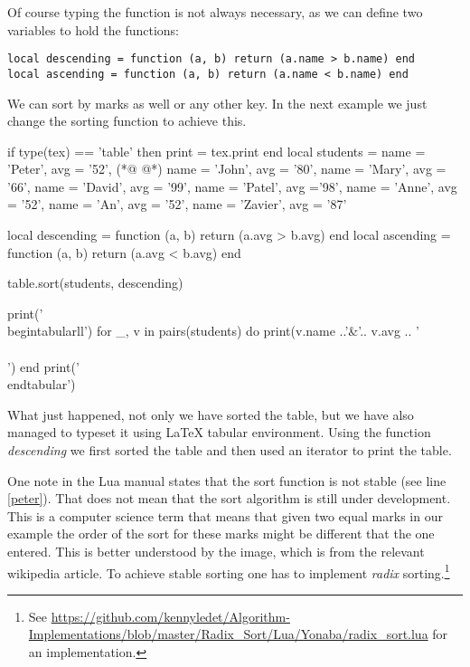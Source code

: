 Of course typing the function is not always necessary, as we can define two variables to hold the functions:

\begin{scriptexample}{}{}
\begin{verbatim}
local descending = function (a, b) return (a.name > b.name) end
local ascending = function (a, b) return (a.name < b.name) end
\end{verbatim}
\end{scriptexample}

We can sort by marks as well or any other key. In the next example we just change the sorting function to achieve this.


\begin{teX}
\begin{luacode}
if type(tex) == 'table' then print = tex.print end
local students = {
  {name = 'Peter', avg = '52'},  (*@\label{peter}  @*)
  {name = 'John', avg = '80'},
  {name = 'Mary', avg = '66'},
  {name = 'David', avg = '99'}, 
  {name = 'Patel', avg ='98'},
  {name = 'Anne', avg = '52'},
  {name = 'An', avg = '52'},
  {name = 'Zavier', avg = '87'} 
}

local descending = function (a, b) return (a.avg > b.avg) end
local ascending = function (a, b) return (a.avg < b.avg) end

table.sort(students, descending)   

print('\\begin{tabular}{ll}')
for _, v in pairs(students) do
   print(v.name ..'&'..  v.avg .. '\\\\')
end
print('\\end{tabular}')
\end{luacode}
\end{teX}

What just happened, not only we have sorted the table, but we have also managed to typeset it using LaTeX tabular environment. Using the function \emph{descending} we first sorted the table and then used an iterator to print the table.

One note in the Lua manual states that the sort function is not stable (see line \ref{peter}). That does not mean that the sort algorithm is still under development. This is a computer science term that means that given two equal marks in our example the order of the sort for these marks might be different that the one entered. This is better understood by the image, which is from the relevant wikipedia article. To achieve stable sorting one has to implement \emph{radix} sorting.\footnote{See \url{https://github.com/kennyledet/Algorithm-Implementations/blob/master/Radix_Sort/Lua/Yonaba/radix_sort.lua} for an implementation.}

